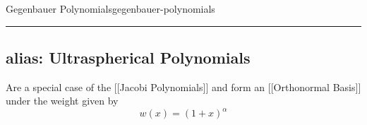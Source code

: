 \begin{definition}{Gegenbauer Polynomials}{gegenbauer-polynomials}
  \begin{center}\rule{0.5\linewidth}{0.5pt}\end{center}

  \hypertarget{alias-ultraspherical-polynomials}{%
    \subsection{alias: Ultraspherical
      Polynomials}\label{alias-ultraspherical-polynomials}}

  Are a special case of the {[}{[}Jacobi Polynomials{]}{]} and form an
  {[}{[}Orthonormal Basis{]}{]} under the weight given by
  \[w(x)=(1+x)^\alpha\]
\end{definition}
